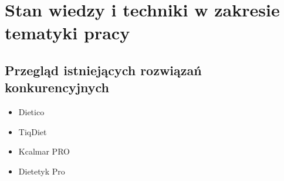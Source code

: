 \chapter{Stan wiedzy i techniki w zakresie tematyki pracy}
\section{Przegląd istniejących rozwiązań konkurencyjnych}
\begin{itemize}
    \item Dietico
    \item TiqDiet
    \item Kcalmar PRO
    \item Dietetyk Pro
\end{itemize}

